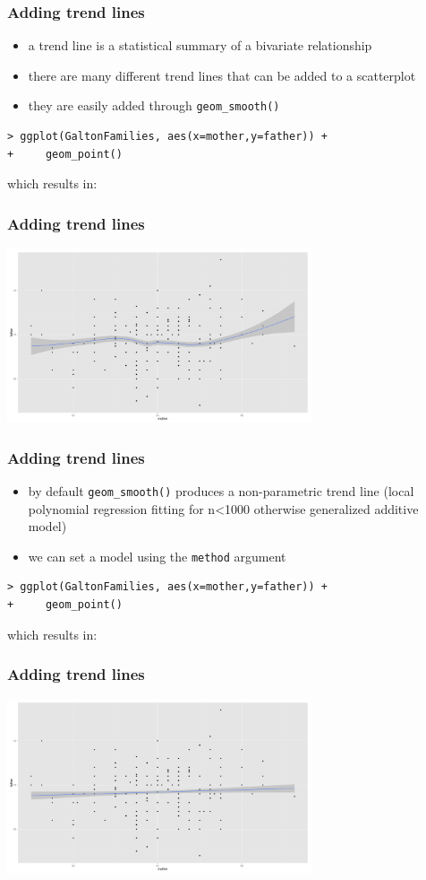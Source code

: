 \documentclass[xcolor={table}]{beamer}
\begin{document}
\begin{frame}[fragile]\frametitle{Adding trend lines}
  \begin{itemize}
  \item a trend line is a statistical summary of a bivariate relationship
  \item there are many different trend lines that can be added to a scatterplot
  \item they are easily added through \texttt{geom\_smooth()}
  \end{itemize}\small
\begin{verbatim}
> ggplot(GaltonFamilies, aes(x=mother,y=father)) +
+     geom_point()
\end{verbatim}
which results in:
\end{frame}


\begin{frame}\frametitle{Adding trend lines}
  \begin{center}
    \includegraphics[width=9cm]{scattertrend1.png}
  \end{center}
\end{frame}


\begin{frame}[fragile]\frametitle{Adding trend lines}
  \begin{itemize}
  \item by default \texttt{geom\_smooth()} produces a non-parametric trend line (local polynomial regression fitting for n<1000 otherwise generalized additive model)
  \item we can set a model using the \texttt{method} argument
  \end{itemize}\small
\begin{verbatim}
> ggplot(GaltonFamilies, aes(x=mother,y=father)) +
+     geom_point()
\end{verbatim}
which results in:
\end{frame}


\begin{frame}\frametitle{Adding trend lines}
  \begin{center}
    \includegraphics[width=9cm]{scattertrend2.png}
  \end{center}
\end{frame}
\end{document}
